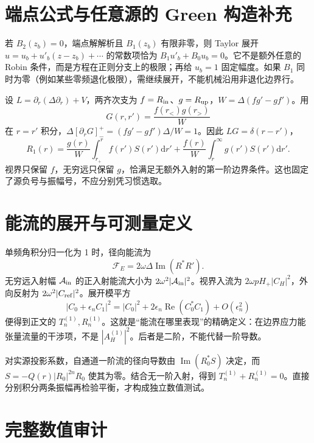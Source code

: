 \documentclass[UTF8,fontset=fandol,11pt,a4paper,oneside]{ctexart}
\numberwithin{equation}{section}
\newcommand{\dd}{\mathrm d}
\newcommand{\Ree}{\operatorname{Re}}
\newcommand{\Imm}{\operatorname{Im}}
\begin{document}
\appendix

\section{端点公式与任意源的 Green 构造补充}
若 $B_2(z_b)=0$，端点解解析且 $B_1(z_b)$ 有限非零，则 Taylor 展开 $u=u_b+u'_b(z-z_b)+\cdots$ 的常数项恰为 $B_1u'_b+B_0u_b=0$。它不是额外任意的 Robin 条件，而是方程在正则分支上的极限；再给 $u_b=1$ 固定幅度。如果 $B_1$ 同时为零（例如某些零频退化极限），需继续展开，不能机械沿用非退化边界行。

设 $L=\partial_r(\Delta\partial_r)+V$，两齐次支为 $f=R_{\rm in}$、$g=R_{\rm up}$，$W=\Delta(fg'-gf')$。用
\begin{equation}
 G(r,r')=\frac{f(r_<)g(r_>)}{W}
\end{equation}
在 $r=r'$ 积分，$\Delta[\partial_rG]_-^+=(fg'-gf')\Delta/W=1$。因此 $LG=\delta(r-r')$，
\begin{equation}
 R_1(r)=\frac{g(r)}W\int_{r_+}^{r}f(r')S(r')\dd r'
 +\frac{f(r)}W\int_r^\infty g(r')S(r')\dd r'.
\end{equation}
视界只保留 $f$，无穷远只保留 $g$，恰满足无额外入射的第一阶边界条件。这也固定了源负号与振幅号，不应分别凭习惯选取。

\section{能流的展开与可测量定义}
单频角积分归一化为 1 时，径向能流为
\begin{equation}
 \mathcal F_E=2\omega\Delta\Imm(R^*R').
\end{equation}
无穷远入射幅 $\mathcal A_{\rm in}$ 的正入射能流大小为 $2\omega^2|\mathcal A_{\rm in}|^2$。视界入流为 $2\omega pH_+|C_H|^2$，外向反射为 $2\omega^2|C_{\rm ref}|^2$。展开模平方
\begin{equation}
 |C_0+\epsilon_n C_1|^2=|C_0|^2+
 2\epsilon_n\Ree(C_0^*C_1)+O(\epsilon_n^2)
\end{equation}
便得到正文的 $T_n^{(1)},R_n^{(1)}$。这就是“能流在哪里表现”的精确定义：在边界应力能张量流量的干涉项，不是 $|A_H^{(1)}|^2$。后者是二阶，不能代替一阶导数。

对实源投影系数，自通道一阶流的径向导数由 $\Imm(R_0^*S)$ 决定，而 $S=-Q(r)|R_0|^{2n}R_0$ 使其为零。结合无一阶入射，得到 $T_n^{(1)}+R_n^{(1)}=0$。直接分别积分两条振幅再检验平衡，才构成独立数值测试。

\section{完整数值审计}\label{sec:all-numerical-audits}
\end{document}
